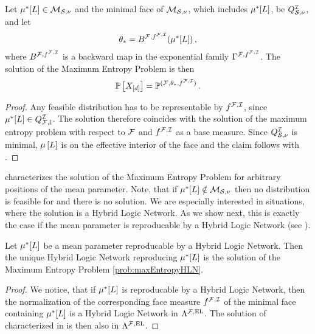 \begin{theorem}
    \label{the:maxEntropyCharacterizationHLN}
    Let $\mu^*[L]\in\mathcal{M}_{\mathcal{S},\nu}$ and the minimal face of $\mathcal{M}_{\mathcal{S},\nu}$, which includes $\mu^*[L]$, be $Q^{\mathcal{I}}_{\mathcal{S},\nu}$, and let
    \begin{align*}
        \theta_{*} = B^{\mathcal{F},f^{\mathcal{F},\mathcal{I}}}(\mu^*[L]) \, ,
    \end{align*}
    where $B^{\mathcal{F},f^{\mathcal{F},\mathcal{I}}}$ is a backward map in the exponential family $\Gamma^{\mathcal{F},f^{\mathcal{F},\mathcal{I}}}$.
    The solution of the Maximum Entropy Problem  is then
    \begin{align*}
        \mathbb{P}\left[X_{[d]}\right] = \mathbb{P}^{(\mathcal{F},\theta_{*},f^{\mathcal{F},\mathcal{I}})} \, .
    \end{align*}
\end{theorem}
\begin{proof}
    Any feasible distribution has to be representable by $f^{\mathcal{F},\mathcal{I}}$, since $\mu^*[L]\in Q^{\mathcal{I}}_{\mathcal{F},\mathbb{I}}$.
    The solution therefore coincides with the solution of the maximum entropy problem with respect to $\mathcal{F}$ and $f^{\mathcal{F},\mathcal{I}}$ as a base measure.
    Since $Q^{\mathcal{I}}_{\mathcal{S},\nu}$ is minimal, $\mu\left[L\right]$ is on the effective interior of the face and the claim follows with .
\end{proof}

 characterizes the solution of the Maximum Entropy Problem for arbitrary positions of the mean parameter.
Note, that if $\mu^*[L]\notin\mathcal{M}_{\mathcal{S},\nu}$ then no distribution is feasible for  and there is no solution.
We are especially interested in situations, where the solution is a Hybrid Logic Network.
As we show next, this is exactly the case if the mean parameter is reproducable by a Hybrid Logic Network (see ).

\begin{theorem}
    Let $\mu^*[L]$ be a mean parameter reproducable by a Hybrid Logic Network. %
    Then the unique Hybrid Logic Network reproducing $\mu^*[L]$ is the solution of the Maximum Entropy Problem \eqref{prob:maxEntropyHLN}.
\end{theorem}
\begin{proof}
    We notice, that if $\mu^*[L]$ is reproducable by a Hybrid Logic Network, then the normalization of the corresponding face measure $f^{\mathcal{F},\mathcal{I}}$ of the minimal face containing $\mu^*[L]$ is a Hybrid Logic Network in $\Lambda^{\mathcal{F},\mathrm{EL}}$.
    The solution of  characterized in  is then also in $\Lambda^{\mathcal{F},\mathrm{EL}}$.
\end{proof}


